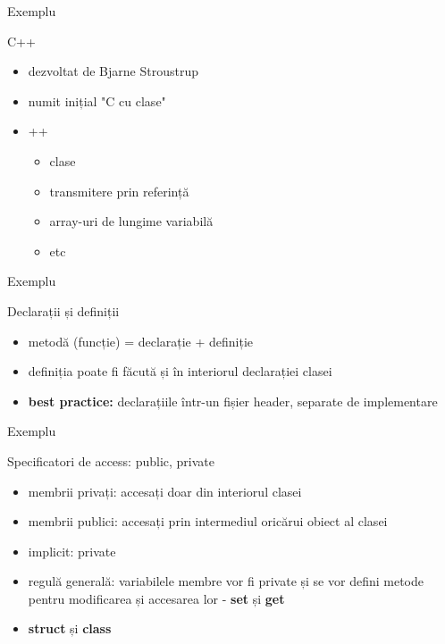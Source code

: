 \documentclass{beamer}
\begin{document}
\begin{frame}{Exemplu}
	\footnotesize{}
\end{frame}

\begin{frame}{C++}
  \begin{itemize}
  \item dezvoltat de Bjarne Stroustrup
  \item numit inițial "C cu clase"
  \item ++
    \begin{itemize}
	  \item clase
	  \item transmitere prin referință
	  \item array-uri de lungime variabilă
	  \item etc
	\end{itemize}
  \end{itemize}
\end{frame}

\begin{frame}{Exemplu}
  \footnotesize{}
\end{frame}

\begin{frame}{Declarații și definiții}
  \begin{itemize}
  \item metodă (funcție) = declarație + definiție
  \item definiția poate fi făcută și în interiorul declarației clasei 
  \item \textbf{best practice:} declarațiile într-un fișier header, separate de implementare
  \end{itemize}
\end{frame}

\begin{frame}{Exemplu}
	\footnotesize{}
\end{frame}

\begin{frame}{Specificatori de access: public, private}
  \begin{itemize}
  \item membrii privați: accesați doar din interiorul clasei
  \item membrii publici: accesați prin intermediul oricărui obiect al clasei
  \item implicit: private
  \item regulă generală: variabilele membre vor fi private și se vor defini metode pentru modificarea și accesarea lor - \textbf{set} și \textbf{get} 
  \item \textbf{struct} și \textbf{class}
  \end{itemize}
\end{frame}
               
\end{document}
